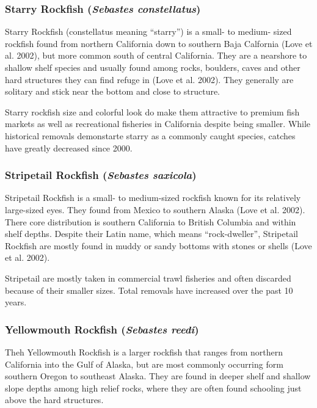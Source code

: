 \documentclass[
  letterpaper,
]{article}
\begin{document}
\subsubsection{\texorpdfstring{Starry Rockfish (\emph{Sebastes
constellatus})}{Starry Rockfish (Sebastes constellatus)}}\label{starry-rockfish-sebastes-constellatus}

Starry Rockfish (constellatus meaning ``starry'') is a small- to medium-
sized rockfish found from northern California down to southern Baja
Calfornia (Love et al. 2002), but more common south of central
California. They are a nearshore to shallow shelf species and usually
found among rocks, boulders, caves and other hard structures they can
find refuge in (Love et al. 2002). They generally are solitary and stick
near the bottom and close to structure.

Starry rockfish size and colorful look do make them attractive to
premium fish markets as well as recreational fisheries in California
despite being smaller. While historical removals demonstarte starry as a
commonly caught species, catches have greatly decreased since 2000.

\subsubsection{\texorpdfstring{Stripetail Rockfish (\emph{Sebastes
saxicola})}{Stripetail Rockfish (Sebastes saxicola)}}\label{stripetail-rockfish-sebastes-saxicola}

Stripetail Rockfish is a small- to medium-sized rockfish known for its
relatively large-sized eyes. They found from Mexico to southern Alaska
(Love et al. 2002). There core distribution is southern California to
British Columbia and within shelf depths. Despite their Latin name,
which means ``rock-dweller'', Stripetail Rockfish are mostly found in
muddy or sandy bottoms with stones or shells (Love et al. 2002).

Stripetail are mostly taken in commercial trawl fisheries and often
discarded because of their smaller sizes. Total removals have increased
over the past 10 years.

\subsubsection{\texorpdfstring{Yellowmouth Rockfish (\emph{Sebastes
reedi})}{Yellowmouth Rockfish (Sebastes reedi)}}\label{yellowmouth-rockfish-sebastes-reedi}

Theh Yellowmouth Rockfish is a larger rockfish that ranges from northern
California into the Gulf of Alaska, but are most commonly occurring form
southern Oregon to southeast Alaska. They are found in deeper shelf and
shallow slope depths among high relief rocks, where they are often found
schooling just above the hard structures.
\end{document}

